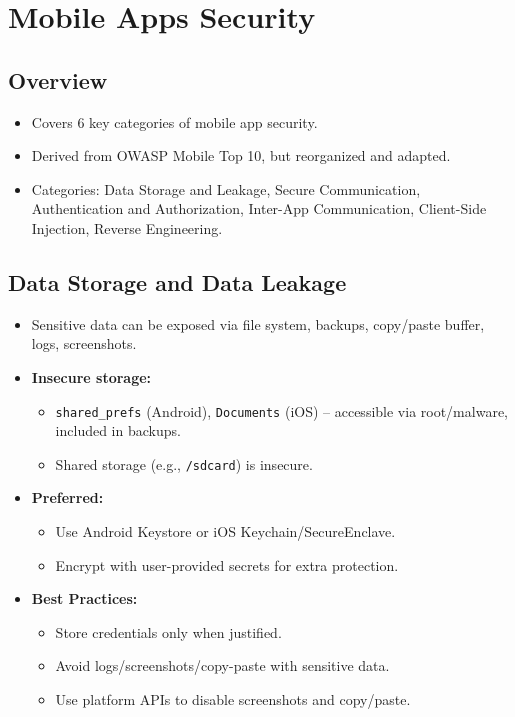 \section{Mobile Apps Security}

\subsection{Overview}
{
\begin{itemize}[noitemsep]
  \item Covers 6 key categories of mobile app security.
  \item Derived from OWASP Mobile Top 10, but reorganized and adapted.
  \item Categories: Data Storage and Leakage, Secure Communication, Authentication and Authorization, Inter-App Communication, Client-Side Injection, Reverse Engineering.
\end{itemize}
}
\subsection{Data Storage and Data Leakage}
{
\begin{itemize}[noitemsep]
  \item Sensitive data can be exposed via file system, backups, copy/paste buffer, logs, screenshots.
  \item \textbf{Insecure storage:}
    \begin{itemize}[noitemsep]
      \item \texttt{shared\_prefs} (Android), \texttt{Documents} (iOS) – accessible via root/malware, included in backups.
      \item Shared storage (e.g., \texttt{/sdcard}) is insecure.
    \end{itemize}
  \item \textbf{Preferred:}
    \begin{itemize}[noitemsep]
      \item Use Android Keystore or iOS Keychain/SecureEnclave.
      \item Encrypt with user-provided secrets for extra protection.
    \end{itemize}
  \item \textbf{Best Practices:}
    \begin{itemize}[noitemsep]
      \item Store credentials only when justified.
      \item Avoid logs/screenshots/copy-paste with sensitive data.
      \item Use platform APIs to disable screenshots and copy/paste.
    \end{itemize}
\end{itemize}
}

